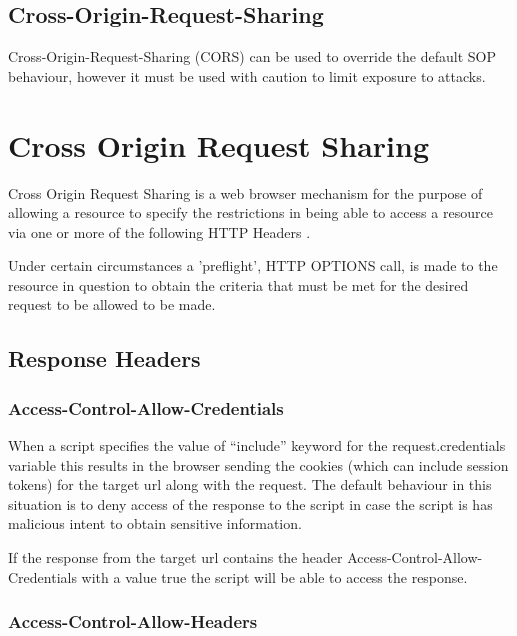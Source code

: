 \documentclass{mscreport}
\begin{document}
\subsection{Cross-Origin-Request-Sharing}
\label{section:Cross-Origin-Request-Sharing}
Cross-Origin-Request-Sharing (CORS) can be used to override the default SOP behaviour, however it must be used with caution to limit exposure to attacks.


\newpage

\section{Cross Origin Request Sharing}

Cross Origin Request Sharing is a web browser mechanism for the purpose of allowing a resource to specify the restrictions in being able to access a resource via one or more of the following HTTP Headers \cite{Apple2006-hk}.

\vspace{0.3cm}
\noindent
Under certain circumstances a 'preflight', HTTP OPTIONS call, is made to the resource in question to obtain the criteria that must be met for the desired request to be allowed to be made.

\subsection{Response Headers}

\subsubsection{Access-Control-Allow-Credentials}

When a script specifies the value of “include” keyword for the request.credentials variable this results in the browser sending the cookies (which can include session tokens) for the target url along with the request. The default behaviour in this situation is to deny access of the response to the script in case the script is has malicious intent to obtain sensitive information.

\vspace{0.3cm}
\noindent
If the response from the target url contains the header Access-Control-Allow-Credentials with a value true the script will be able to access the response.

\subsubsection{Access-Control-Allow-Headers}
\end{document}
